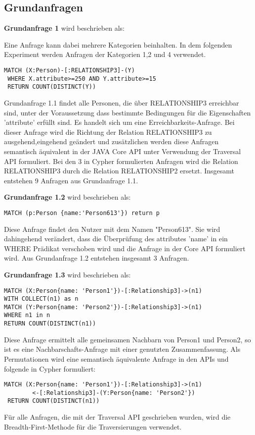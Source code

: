 \subsection{Grundanfragen}
 \textbf{Grundanfrage 1} wird beschrieben als:

Eine Anfrage kann dabei mehrere Kategorien beinhalten. In dem folgenden Experiment werden  Anfragen der Kategorien 1,2 und 4 verwendet. \newline

\begin{Verbatim}[frame=single]
 MATCH (X:Person)-[:RELATIONSHIP3]-(Y) 
 WHERE X.attribute>=250 AND Y.attribute>=15  
 RETURN COUNT(DISTINCT(Y))
\end{Verbatim} 
Grundanfrage 1.1 findet alle Personen, die über RELATIONSHIP3 erreichbar sind, unter der Voraussetzung dass bestimmte Bedingungen für die Eigenschaften 'attribute' erfüllt sind. Es handelt sich um eine Erreichbarkeits-Anfrage. Bei dieser Anfrage wird die Richtung der Relation RELATIONSHIP3 zu ausgehend,eingehend  geändert und zusätzlichen werden diese Anfragen  semantisch äquivalent in der JAVA Core API unter Verwendung der Traversal API formuliert. Bei den 3 in Cypher formulierten Anfragen wird die Relation RELATIONSHIP3 durch die Relation RELATIONSHIP2 ersetzt. Insgesamt entstehen 9 Anfragen aus Grundanfrage 1.1. \newline 

 \textbf{Grundanfrage 1.2} wird beschrieben als: 
\begin{Verbatim}[frame=single]
MATCH (p:Person {name:'Person613'}) return p
\end{Verbatim} 
Diese Anfrage findet den Nutzer mit dem Namen "Person613". Sie wird dahingehend verändert, dass die Überprüfung des attributes 'name' in ein WHERE Prädikat verschoben wird und die Anfrage  in der Core API formuliert wird. Aus Grundanfrage 1.2 entstehen insgesamt 3 Anfragen.\newline 

\textbf{Grundanfrage 1.3} wird beschrieben als: 
\begin{Verbatim}[frame=single]
MATCH (X:Person{name: 'Person1'})-[:Relationship3]->(n1) 
WITH COLLECT(n1) as n 
MATCH (Y:Person{name: 'Person2'})-[:Relationship3]->(n1) 
WHERE n1 in n
RETURN COUNT(DISTINCT(n1))
\end{Verbatim} 
Diese Anfrage ermittelt alle gemeinsamen Nachbarn von Person1 und Person2, so ist es eine Nachbarschafts-Anfrage mit einer genutzten Zusammenfassung. Als Permutationen wird eine semantisch äquivalente Anfrage in den APIs und folgende in Cypher formuliert:
\begin{Verbatim}[frame=single]
 MATCH (X:Person{name: 'Person1'})-[:Relationship3]->(n1)
 		<-[:Relationship3]-(Y:Person{name: 'Person2'}) 
 RETURN COUNT(DISTINCT(n1))
\end{Verbatim} 
Für alle Anfragen, die mit der Traversal API geschrieben wurden, wird die Breadth-First-Methode für die Traversierungen verwendet. \newline


